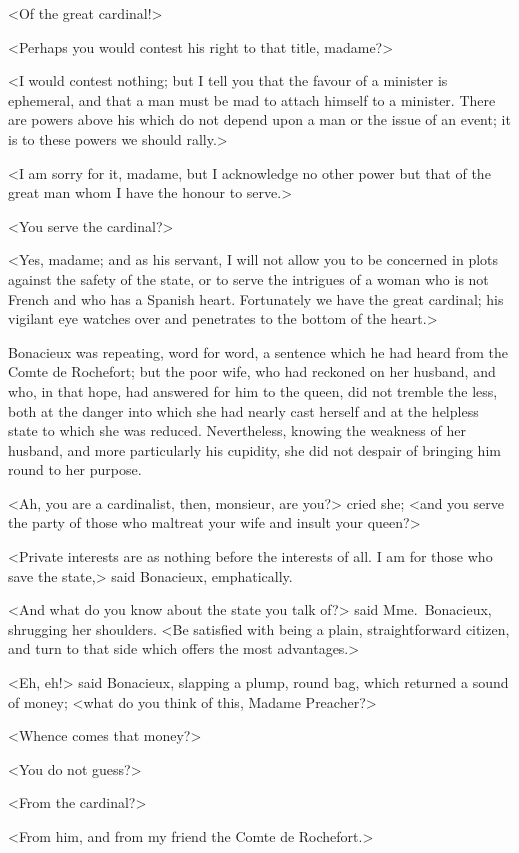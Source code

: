<Of the great cardinal!> 

<Perhaps you would contest his right to that title, madame?> 

<I would contest nothing; but I tell you that the favour of a minister is ephemeral, and that a man must be mad to attach himself to a minister. There are powers above his which do not depend upon a man or the issue of an event; it is to these powers we should rally.> 

<I am sorry for it, madame, but I acknowledge no other power but that of the great man whom I have the honour to serve.> 

<You serve the cardinal?> 

<Yes, madame; and as his servant, I will not allow you to be concerned in plots against the safety of the state, or to serve the intrigues of a woman who is not French and who has a Spanish heart. Fortunately we have the great cardinal; his vigilant eye watches over and penetrates to the bottom of the heart.> 

Bonacieux was repeating, word for word, a sentence which he had heard from the Comte de Rochefort; but the poor wife, who had reckoned on her husband, and who, in that hope, had answered for him to the queen, did not tremble the less, both at the danger into which she had nearly cast herself and at the helpless state to which she was reduced. Nevertheless, knowing the weakness of her husband, and more particularly his cupidity, she did not despair of bringing him round to her purpose. 

<Ah, you are a cardinalist, then, monsieur, are you?> cried she; <and you serve the party of those who maltreat your wife and insult your queen?> 

<Private interests are as nothing before the interests of all. I am for those who save the state,> said Bonacieux, emphatically. 

<And what do you know about the state you talk of?> said Mme.~Bonacieux, shrugging her shoulders. <Be satisfied with being a plain, straightforward citizen, and turn to that side which offers the most advantages.> 

<Eh, eh!> said Bonacieux, slapping a plump, round bag, which returned a sound of money; <what do you think of this, Madame Preacher?> 

<Whence comes that money?> 

<You do not guess?> 

<From the cardinal?> 

<From him, and from my friend the Comte de Rochefort.> 

